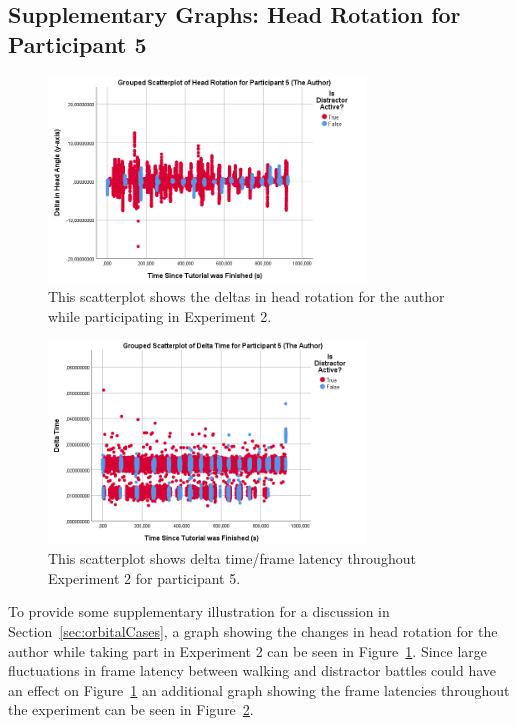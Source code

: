 \subsection{Supplementary Graphs: Head Rotation for Participant 5}
\begin{figure}[tbph]
    \centering
    \includegraphics[width=0.75\textwidth]{figures/graphs/authorHeadRotationEx2.png}
    \caption[Head Rotation Deltas for Participant 5 in Experiment 2]{This scatterplot shows the deltas in head rotation for the author while participating in Experiment 2.}
    \label{fig:ex2headRotationAuthor}
\end{figure}

\begin{figure}[tbph]
    \centering
    \includegraphics[width=0.75\textwidth]{figures/graphs/ex2AuthorDeltaTime.png}
    \caption[Delta Time for Participant 5 in Experiment 2]{This scatterplot shows delta time/frame latency throughout Experiment 2 for participant 5.}
    \label{fig:ex2DeltaTimeAuthor}
\end{figure}

To provide some supplementary illustration for a discussion in Section~\ref{sec:orbitalCases}, a graph showing the changes in head rotation for the author while taking part in Experiment 2 can be seen in Figure~\ref{fig:ex2headRotationAuthor}. Since large fluctuations in frame latency between walking and distractor battles could have an effect on Figure~\ref{fig:ex2headRotationAuthor} an additional graph showing the frame latencies throughout the experiment can be seen in Figure~\ref{fig:ex2DeltaTimeAuthor}.

